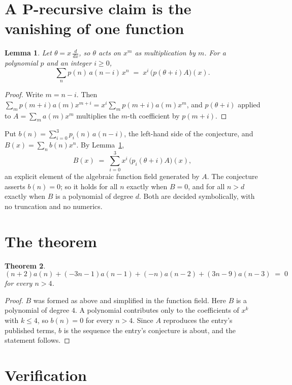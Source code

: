 \documentclass[11pt,a4paper]{article}
\theoremstyle{plain}
\newtheorem{theorem}{Theorem}
\newtheorem{lemma}[theorem]{Lemma}
\theoremstyle{definition}
\begin{document}
\section{A P-recursive claim is the vanishing of one function}

\begin{lemma}\label{lem:theta}
Let $\theta=x\,\frac{d}{dx}$, so $\theta$ acts on $x^m$ as multiplication by $m$. For a
polynomial $p$ and an integer $i\ge0$,
\[
\sum_{n} p(n)\,a(n-i)\,x^{n}\;=\;x^{i}\,\bigl(p(\theta+i)A\bigr)(x).
\]
\end{lemma}

\begin{proof}
Write $m=n-i$. Then $\sum_m p(m+i)a(m)x^{m+i}=x^i\sum_m p(m+i)a(m)x^m$, and $p(\theta+i)$
applied to $A=\sum_m a(m)x^m$ multiplies the $m$-th coefficient by $p(m+i)$.
\end{proof}

Put $b(n)=\sum_{i=0}^{3}p_i(n)\,a(n-i)$, the left-hand side of the conjecture, and
$B(x)=\sum_n b(n)x^n$. By Lemma~\ref{lem:theta},
\[
B(x)\;=\;\sum_{i=0}^{3}x^{i}\,\bigl(p_i(\theta+i)A\bigr)(x),
\]
an explicit element of the algebraic function field generated by $A$. The conjecture asserts
$b(n)=0$; so it holds for all $n$ exactly when $B=0$, and for all $n>d$ exactly when $B$ is a
polynomial of degree $d$. Both are decided symbolically, with no truncation and no numerics.

\section{The theorem}

\begin{theorem}
\[
\left(n + 2\right)a(n) + \left(- 3 n - 1\right)a(n-1) + \left(- n\right)a(n-2) + \left(3 n - 9\right)a(n-3)\;=\;0
\]
for every $n>4$.
\end{theorem}

\begin{proof}
$B$ was formed as above and simplified in the function field. Here $B$ is a polynomial of degree $4$. A polynomial contributes only to the coefficients of $x^k$ with $k\le4$, so $b(n)=0$ for every $n>4$. Since $A$ reproduces the
entry's published terms, $b$ is the sequence the entry's conjecture is about, and the statement
follows.
\end{proof}

\section{Verification}
\end{document}
